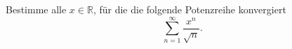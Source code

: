 \begin{prob}
Bestimme alle $x\in \mathbb{R}$, für die die folgende Potenzreihe konvergiert
$$\sum_{n=1}^\infty \frac{x^n}{\sqrt{n}}.$$ 
\end{prob}
